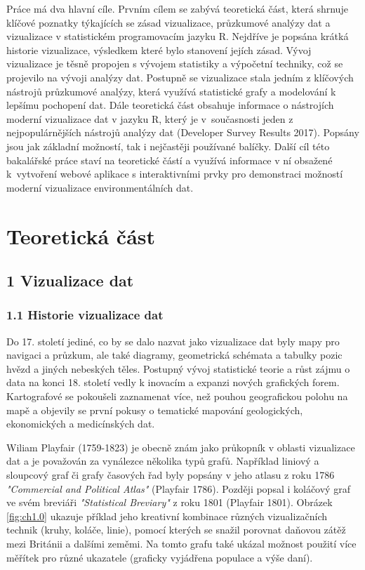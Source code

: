 \documentclass[12pt,]{article}
\begin{document}
\qquad Práce má dva hlavní cíle. Prvním cílem se zabývá teoretická část,
která shrnuje klíčové poznatky týkajících se zásad vizualizace,
průzkumové analýzy dat a vizualizace v statistickém programovacím jazyku
R. Nejdříve je popsána krátká historie vizualizace, výsledkem které bylo
stanovení jejích zásad. Vývoj vizualizace je těsně propojen s vývojem
statistiky a výpočetní techniky, což se projevilo na vývoji analýzy dat.
Postupně se vizualizace stala jedním z klíčových nástrojů průzkumové
analýzy, která využívá statistické grafy a modelování k lepšímu
pochopení dat. Dále teoretická část obsahuje informace o nástrojích
moderní vizualizace dat v jazyku R, který je v~současnosti jeden z
nejpopulárnějších nástrojů analýzy dat (Developer Survey Results 2017).
Popsány jsou jak základní možností, tak i nejčastěji používané balíčky.
Další cíl této bakalářské práce staví na teoretické částí a využívá
informace v ní obsažené k~vytvoření webové aplikace s interaktivními
prvky pro demonstraci možností moderní vizualizace environmentálních
dat.

\newpage

\section*{Teoretická část}\label{teoreticka-cast}

\subsection{1 Vizualizace dat}\label{vizualizace-dat}

\subsubsection{1.1 Historie vizualizace
dat}\label{historie-vizualizace-dat}

\qquad Do 17. století jediné, co by se dalo nazvat jako vizualizace dat
byly mapy pro navigaci a průzkum, ale také diagramy, geometrická
schémata a tabulky pozic hvězd a jiných nebeských těles. Postupný vývoj
statistické teorie a růst zájmu o data na konci 18. století vedly k
inovacím a expanzi nových grafických forem. Kartografové se pokoušeli
zaznamenat více, než pouhou geografickou polohu na mapě a objevily se
první pokusy o tematické mapování geologických, ekonomických a
medicínských dat.

\qquad Wiliam Playfair (1759-1823) je obecně znám jako průkopník v
oblasti vizualizace dat a je považován za vynálezce několika typů grafů.
Například liniový a sloupcový graf či grafy časových řad byly popsány v
jeho atlasu z roku 1786 \textit{"Commercial and Political Atlas"}
(Playfair 1786). Později popsal i koláčový graf ve svém breviáři
\textit{"Statistical Breviary"} z roku 1801 (Playfair 1801). Obrázek
\ref{fig:ch1.0} ukazuje příklad jeho kreativní kombinace různých
vizualizačních technik (kruhy, koláče, linie), pomocí kterých se snažil
porovnat daňovou zátěž mezi Británii a dalšími zeměmi. Na tomto grafu
také ukázal možnost použití více měřítek pro různé ukazatele (graficky
vyjádřena populace a výše daní).
\end{document}
